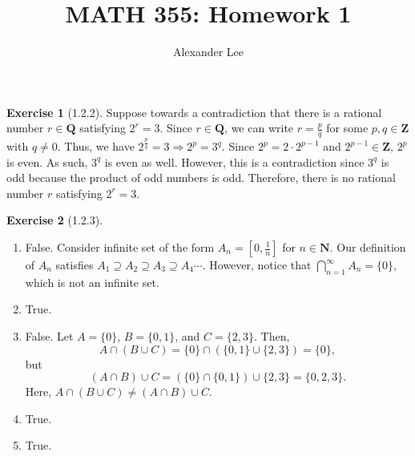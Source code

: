 \documentclass{amsart}
\title{MATH 355: Homework 1}
\author{Alexander Lee}
\theoremstyle{definition}
\newtheorem{exercise}{Exercise}
\newcommand{\N}{\mathbf{N}}
\newcommand{\Z}{\mathbf{Z}}
\newcommand{\Q}{\mathbf{Q}}
\begin{document}
\maketitle

\begin{exercise}[1.2.2]
  Suppose towards a contradiction that there is a rational number $r \in \Q$
  satisfying $2^r = 3$. Since $r \in \Q$, we can write $r = \frac{p}{q}$ for
  some $p, q \in \Z$ with $q \neq 0$. Thus, we have $2^\frac{p}{q} = 3
  \Rightarrow 2^p = 3^q$. Since $2^p = 2 \cdot 2^{p-1}$ and $2^{p-1} \in \Z$,
  $2^p$ is even. As such, $3^q$ is even as well. However, this is a
  contradiction since $3^q$ is odd because the product of odd numbers is odd.
  Therefore, there is no rational number $r$ satisfying $2^r = 3$.
\end{exercise}

\begin{exercise}[1.2.3]
  \begin{enumerate}[label={(\alph*)}]
    \item False. Consider infinite set of the form $A_n = [0, \frac{1}{n}]$ for
      $n \in \N$. Our definition of $A_n$ satisfies $A_1 \supseteq A_2 \supseteq
      A_3 \supseteq A_4 \cdots$. However, notice that $\bigcap_{n=1}^{\infty}
      A_n = \{0\}$, which is not an infinite set.
    \item True.
    \item False. Let $A = \{0\}$, $B = \{0, 1\}$, and $C = \{2, 3\}$. Then,
      \[
        A \cap (B \cup C) = \{0\} \cap (\{0, 1\} \cup \{2, 3\}) = \{0\},
      \]
      but
      \[
        (A \cap B) \cup C = (\{0\} \cap \{0, 1\}) \cup \{2, 3\} = \{0, 2, 3\}.
      \]
      Here, $A \cap (B \cup C) \neq (A \cap B) \cup C$.
    \item True.
    \item True.
  \end{enumerate}
\end{exercise}
\end{document}
